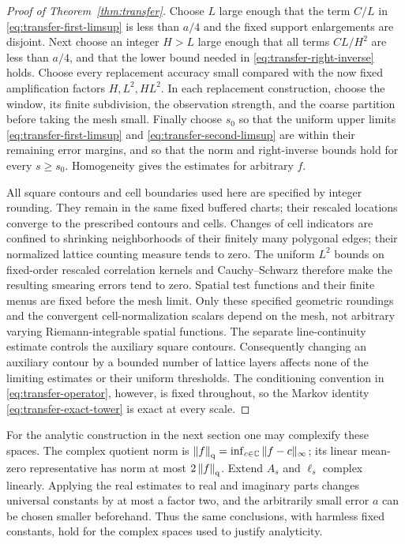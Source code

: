 \begin{proof}[Proof of Theorem~\ref{thm:transfer}]
Choose $L$ large enough that the term $C/L$ in
\eqref{eq:transfer-first-limsup} is less than $a/4$ and the fixed
support enlargements are disjoint.  Next choose an integer $H>L$
large enough that all terms $CL/H^2$ are less than $a/4$, and that
the lower bound needed in \eqref{eq:transfer-right-inverse} holds.
Choose every replacement accuracy small compared with the now fixed
amplification factors $H,L^2,HL^2$.  In each replacement construction,
choose the window, its finite subdivision, the observation strength,
and the coarse partition before taking the mesh small.  Finally choose
$s_0$ so that the uniform upper limits
\eqref{eq:transfer-first-limsup} and
\eqref{eq:transfer-second-limsup} are within their remaining error
margins, and so that the norm and right-inverse bounds hold for every
$s\geq s_0$.  Homogeneity gives the estimates for arbitrary $f$.

All square contours and cell boundaries used here are specified by
integer rounding.  They remain in the same fixed buffered charts;
their rescaled locations converge to the prescribed contours and
cells.  Changes of cell indicators are confined to shrinking
neighborhoods of their finitely many polygonal edges; their normalized
lattice counting measure tends to zero.  The uniform $L^2$ bounds on
fixed-order rescaled correlation kernels and Cauchy--Schwarz therefore
make the resulting smearing errors tend to zero.  Spatial test functions
and their finite menus are fixed before the mesh limit.  Only these
specified geometric roundings and the convergent cell-normalization
scalars depend on the mesh, not arbitrary varying Riemann-integrable
spatial functions.  The separate line-continuity estimate controls
the auxiliary square contours.  Consequently changing an auxiliary contour by a
bounded number of lattice layers affects none of the limiting
estimates or their uniform thresholds.  The conditioning convention in
\eqref{eq:transfer-operator}, however, is fixed throughout, so the
Markov identity \eqref{eq:transfer-exact-tower} is exact at every scale.
\end{proof}

For the analytic construction in the next section one may complexify
these spaces.  The complex quotient norm is
$\left\|f\right\|_{\mathrm q}=\inf_{c\in\mathbb C}\|f-c\|_\infty$; its linear mean-zero
representative has norm at most $2\left\|f\right\|_{\mathrm q}$.  Extend $A_s$ and
$\ell_s$ complex linearly.  Applying the real estimates to real and
imaginary parts changes universal constants by at most a factor two,
and the arbitrarily small error $a$ can be chosen smaller beforehand.
Thus the same conclusions, with harmless fixed constants, hold for
the complex spaces used to justify analyticity.
